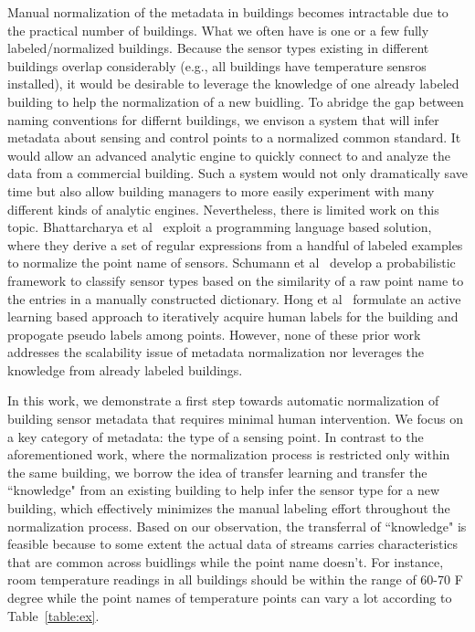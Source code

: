 Manual normalization of the metadata in buildings becomes intractable due to 
the practical number of buildings. What we often have is one or a few fully 
labeled/normalized buildings. Because the sensor types existing in different buildings 
overlap considerably (e.g., all buildings have temperature sensros installed), it 
would be desirable to leverage the knowledge of one already labeled building to 
help the normalization of a new buidling. 
To abridge the gap between naming conventions for differnt buildings, we envison 
a system that will infer metadata about sensing and control points to a normalized 
common standard.
It would allow an advanced analytic engine to quickly connect to and analyze the data 
from a commercial building. Such a system would not only dramatically save time 
but also allow building managers to more easily experiment with many different kinds 
of analytic engines. 
Nevertheless, there is limited work on this topic. 
Bhattarcharya et al~\cite{arka} exploit a programming language based solution, 
where they derive a set of regular expressions from a handful of labeled examples 
to normalize the point name of sensors. 
Schumann et al~\cite{ibm} develop a probabilistic framework to classify sensor types 
based on the similarity of a raw point name to the entries in a manually constructed dictionary. 
Hong et al~\cite{cikm} formulate an active learning based approach to iteratively 
acquire human labels for the building and propogate pseudo labels among points.
However, none of these prior work addresses the scalability issue of metadata 
normalization nor leverages the knowledge from already labeled buildings.

In this work, we demonstrate a first step towards automatic normalization of building 
sensor metadata that requires minimal human intervention. We focus on a key category 
of metadata: the type of a sensing point. In contrast to the aforementioned work, 
where the normalization process is restricted only within the same building, 
we borrow the idea of transfer learning and transfer the ``knowledge" from 
an existing building to help infer the sensor type for a new building, which 
effectively minimizes the manual labeling effort throughout the normalization process. 
Based on our observation, the transferral of ``knowledge" is feasible because 
to some extent the actual data of streams carries characteristics that are common 
across buidlings while the point name doesn't. For instance, room temperature 
readings in all buildings should be within the range of 60-70 F degree while 
the point names of temperature points can vary a lot according to 
Table~\ref{table:ex}.

